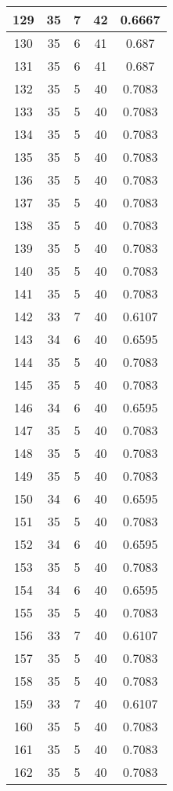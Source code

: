 \documentclass[letterpaper, 12pt]{article}
\begin{document}
\begin{longtable}{|c|c|c|c|c|}
\hline
129 & 35 & 7 & 42 & 0.6667 \\
\hline
130 & 35 & 6 & 41 & 0.687 \\
\hline
131 & 35 & 6 & 41 & 0.687 \\
\hline
132 & 35 & 5 & 40 & 0.7083 \\
\hline
133 & 35 & 5 & 40 & 0.7083 \\
\hline
134 & 35 & 5 & 40 & 0.7083 \\
\hline
135 & 35 & 5 & 40 & 0.7083 \\
\hline
136 & 35 & 5 & 40 & 0.7083 \\
\hline
137 & 35 & 5 & 40 & 0.7083 \\
\hline
138 & 35 & 5 & 40 & 0.7083 \\
\hline
139 & 35 & 5 & 40 & 0.7083 \\
\hline
140 & 35 & 5 & 40 & 0.7083 \\
\hline
141 & 35 & 5 & 40 & 0.7083 \\
\hline
142 & 33 & 7 & 40 & 0.6107 \\
\hline
143 & 34 & 6 & 40 & 0.6595 \\
\hline
144 & 35 & 5 & 40 & 0.7083 \\
\hline
145 & 35 & 5 & 40 & 0.7083 \\
\hline
146 & 34 & 6 & 40 & 0.6595 \\
\hline
147 & 35 & 5 & 40 & 0.7083 \\
\hline
148 & 35 & 5 & 40 & 0.7083 \\
\hline
149 & 35 & 5 & 40 & 0.7083 \\
\hline
150 & 34 & 6 & 40 & 0.6595 \\
\hline
151 & 35 & 5 & 40 & 0.7083 \\
\hline
152 & 34 & 6 & 40 & 0.6595 \\
\hline
153 & 35 & 5 & 40 & 0.7083 \\
\hline
154 & 34 & 6 & 40 & 0.6595 \\
\hline
155 & 35 & 5 & 40 & 0.7083 \\
\hline
156 & 33 & 7 & 40 & 0.6107 \\
\hline
157 & 35 & 5 & 40 & 0.7083 \\
\hline
158 & 35 & 5 & 40 & 0.7083 \\
\hline
159 & 33 & 7 & 40 & 0.6107 \\
\hline
160 & 35 & 5 & 40 & 0.7083 \\
\hline
161 & 35 & 5 & 40 & 0.7083 \\
\hline
162 & 35 & 5 & 40 & 0.7083 \\

\end{longtable}
\end{document}
